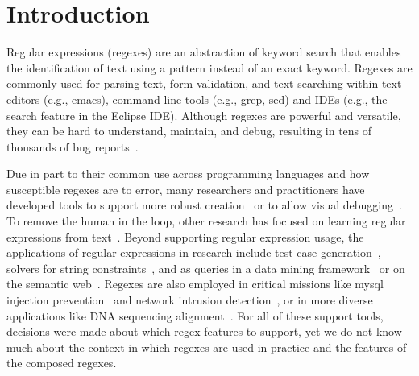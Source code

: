 \section{Introduction }

Regular expressions (regexes) are an abstraction of keyword search that enables the identification of text using a pattern instead of an exact keyword.
Regexes are commonly used for parsing text, form validation, and text searching within text editors (e.g., emacs), command line tools (e.g., grep, sed) and IDEs (e.g., the search feature in the Eclipse IDE).  Although regexes are powerful and versatile, they can be hard to understand,  maintain, and debug, resulting in tens of thousands of bug reports~\cite{Spishak:2012:TSR:2318202.2318207}.

Due in part to their common use across programming languages and how susceptible regexes are to error, many researchers and practitioners have developed tools to support more robust creation~\cite{Spishak:2012:TSR:2318202.2318207} or to allow visual debugging~\cite{Beck:2014:RVD:2591062.2591111}. To remove the human in the loop, other research has focused on learning regular expressions from  text~\cite{Babbar:2010:CBA:1871840.1871848, Li:2008:REL:1613715.1613719}.
Beyond supporting regular expression usage, the applications of regular expressions in research include test case generation~\cite{Ghosh:2013:JAT:2486788.2486925, Galler:2014:STD:2683035.2683100, Anand:2013:OSM:2503903.2503991, Tillmann:2014:TAT:2642937.2642941},
solvers for string constraints~\cite{Trinh:2014:SSS:2660267.2660372, hampi}, and as queries in a data mining framework~\cite{Begel:2010:CDE:1806799.1806821} or on the semantic web~\cite{Lee:2010:PSQ:1871871.1871877}.
Regexes are also employed in critical missions like mysql injection prevention~\cite{Yeole:2011:ADT:1980022.1980229} and network intrusion detection~\cite{network}, or in more diverse applications like DNA sequencing alignment~\cite{1594922}.
For all of these support tools, decisions were made about which regex features to support, yet we do not know much about the context in which regexes are used in practice and the features of the composed regexes.



